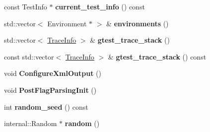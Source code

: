 \begin{DoxyCompactItemize}
\item 
\hypertarget{classtesting_1_1internal_1_1UnitTestImpl_a6c90b6512125a43fba8d1be5f99dde1a}{const Test\-Info $\ast$ {\bfseries current\-\_\-test\-\_\-info} () const }\label{classtesting_1_1internal_1_1UnitTestImpl_a6c90b6512125a43fba8d1be5f99dde1a}

\item 
\hypertarget{classtesting_1_1internal_1_1UnitTestImpl_aa1489e6a2378d64d68bc01963ea5db4a}{std\-::vector$<$ Environment $\ast$ $>$ \& {\bfseries environments} ()}\label{classtesting_1_1internal_1_1UnitTestImpl_aa1489e6a2378d64d68bc01963ea5db4a}

\item 
\hypertarget{classtesting_1_1internal_1_1UnitTestImpl_af8c7c0a0c954e36d83e6e4690d3fb938}{std\-::vector$<$ \hyperlink{structtesting_1_1internal_1_1TraceInfo}{Trace\-Info} $>$ \& {\bfseries gtest\-\_\-trace\-\_\-stack} ()}\label{classtesting_1_1internal_1_1UnitTestImpl_af8c7c0a0c954e36d83e6e4690d3fb938}

\item 
\hypertarget{classtesting_1_1internal_1_1UnitTestImpl_a1fa664f26839f3192f63afb502dee09d}{const std\-::vector$<$ \hyperlink{structtesting_1_1internal_1_1TraceInfo}{Trace\-Info} $>$ \& {\bfseries gtest\-\_\-trace\-\_\-stack} () const }\label{classtesting_1_1internal_1_1UnitTestImpl_a1fa664f26839f3192f63afb502dee09d}

\item 
\hypertarget{classtesting_1_1internal_1_1UnitTestImpl_a21cd7b2928de03a55b5252f29dd5ae6d}{void {\bfseries Configure\-Xml\-Output} ()}\label{classtesting_1_1internal_1_1UnitTestImpl_a21cd7b2928de03a55b5252f29dd5ae6d}

\item 
\hypertarget{classtesting_1_1internal_1_1UnitTestImpl_a772894193104b1b2516f16e6ff813168}{void {\bfseries Post\-Flag\-Parsing\-Init} ()}\label{classtesting_1_1internal_1_1UnitTestImpl_a772894193104b1b2516f16e6ff813168}

\item 
\hypertarget{classtesting_1_1internal_1_1UnitTestImpl_a8ec59a7ab3bad96bccde98ce85ffc864}{int {\bfseries random\-\_\-seed} () const }\label{classtesting_1_1internal_1_1UnitTestImpl_a8ec59a7ab3bad96bccde98ce85ffc864}

\item 
\hypertarget{classtesting_1_1internal_1_1UnitTestImpl_ab3b45b5eb4d583219a3602011ea44347}{internal\-::\-Random $\ast$ {\bfseries random} ()}\label{classtesting_1_1internal_1_1UnitTestImpl_ab3b45b5eb4d583219a3602011ea44347}


\end{DoxyCompactItemize}
